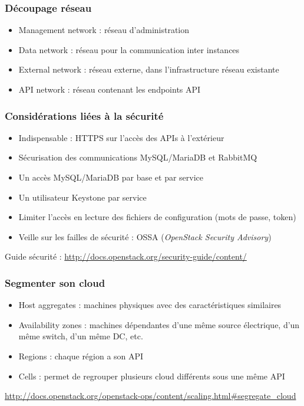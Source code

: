   \begin{frame}
  \frametitle{Découpage réseau}
    \begin{itemize}
      \item Management network : réseau d'administration
      \item Data network : réseau pour la communication inter instances
      \item External network : réseau externe, dans l'infrastructure réseau existante
      \item API network : réseau contenant les endpoints API
    \end{itemize}
  \end{frame}

  \begin{frame}
    \frametitle{Considérations liées à la sécurité}
    \begin{itemize}
      \item Indispensable : HTTPS sur l'accès des APIs à l'extérieur
      \item Sécurisation des communications MySQL/MariaDB et RabbitMQ
      \item Un accès MySQL/MariaDB par base et par service
      \item Un utilisateur Keystone par service
      \item Limiter l'accès en lecture des fichiers de configuration (mots de passe, token)
      \item Veille sur les failles de sécurité : OSSA (\textit{OpenStack Security Advisory})
    \end{itemize}
    Guide sécurité : \url{http://docs.openstack.org/security-guide/content/}
  \end{frame}

  \begin{frame}
    \frametitle{Segmenter son cloud}
    \begin{itemize}
      \item Host aggregates : machines physiques avec des caractéristiques similaires
      \item Availability zones : machines dépendantes d'une même source électrique, d'un même switch, d'un même DC, etc.
      \item Regions : chaque région a son API
      \item Cells : permet de regrouper plusieurs cloud différents sous une même API
    \end{itemize}
    \url{http://docs.openstack.org/openstack-ops/content/scaling.html#segregate_cloud}
  \end{frame}


